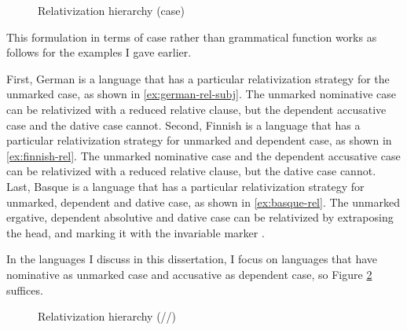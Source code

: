 \begin{figure}[ht]
  \centering
  \caption{Relativization hierarchy (case)}
  \label{fig:rel-def-dep-dat}
\end{figure}

This formulation in terms of case rather than grammatical function works as follows for the examples I gave earlier.

First, German is a language that has a particular relativization strategy for the unmarked case, as shown in \ref{ex:german-rel-subj}. The unmarked nominative case can be relativized with a reduced relative clause, but the dependent accusative case and the dative case cannot.
Second, Finnish is a language that has a particular relativization strategy for unmarked and dependent case, as shown in \ref{ex:finnish-rel}. The unmarked nominative case and the dependent accusative case can be relativized with a reduced relative clause, but the dative case cannot.
Last, Basque is a language that has a particular relativization strategy for unmarked, dependent and dative case, as shown in \ref{ex:basque-rel}. The unmarked ergative, dependent absolutive and dative case can be relativized by extraposing the head, and marking it with the invariable marker .

In the languages I discuss in this dissertation, I focus on languages that have nominative as unmarked case and accusative as dependent case, so Figure \ref{fig:rel-nom-acc-dat} suffices.

\begin{figure}[ht]
  \centering
  \caption{Relativization hierarchy (//)}
  \label{fig:rel-nom-acc-dat}
\end{figure}

